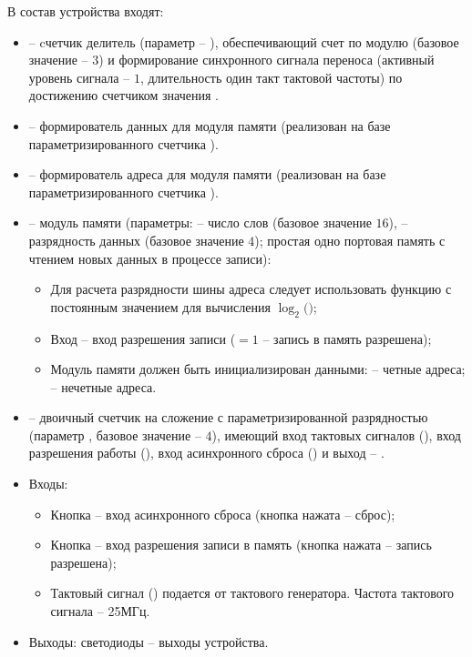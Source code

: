 В состав устройства входят:
\begin{itemize}
	\item {} -- cчетчик делитель (параметр -- ), обеспечивающий счет по модулю  (базовое значение -- $3$) и формирование синхронного сигнала переноса (активный уровень сигнала -- $1$, длительность один такт тактовой частоты) по достижению счетчиком значения .
	\item {} -- формирователь данных для модуля памяти (реализован на базе параметризированного счетчика ).
	\item {} -- формирователь адреса для модуля памяти (реализован на базе параметризированного счетчика ).
	\item {} -- модуль памяти (параметры:  -- число слов (базовое значение $16$),  -- разрядность данных (базовое значение $4$); простая одно портовая память с чтением новых данных в процессе записи):
		\begin{itemize}
			\item Для расчета разрядности шины адреса следует использовать функцию с постоянным значением для вычисления $\log_2($$)$;
			\item Вход  – вход разрешения записи ($=1$ -- запись в память разрешена);
			\item Модуль памяти должен быть инициализирован данными:  -- четные адреса;  -- нечетные адреса.
		\end{itemize}
	\item {} -- двоичный счетчик на сложение с параметризированной разрядностью (параметр , базовое значение -- $4$), имеющий вход тактовых сигналов (), вход разрешения работы (), вход асинхронного сброса () и выход -- .
	\item Входы:
		\begin{itemize}
			\item Кнопка  -- вход асинхронного сброса (кнопка нажата – сброс);
			\item Кнопка  -- вход разрешения записи в память (кнопка нажата – запись разрешена);
			\item Тактовый сигнал () подается от тактового генератора. Частота тактового сигнала -- 25МГц.
		\end{itemize}
	\item Выходы: светодиоды  -- выходы устройства.
\end{itemize}

